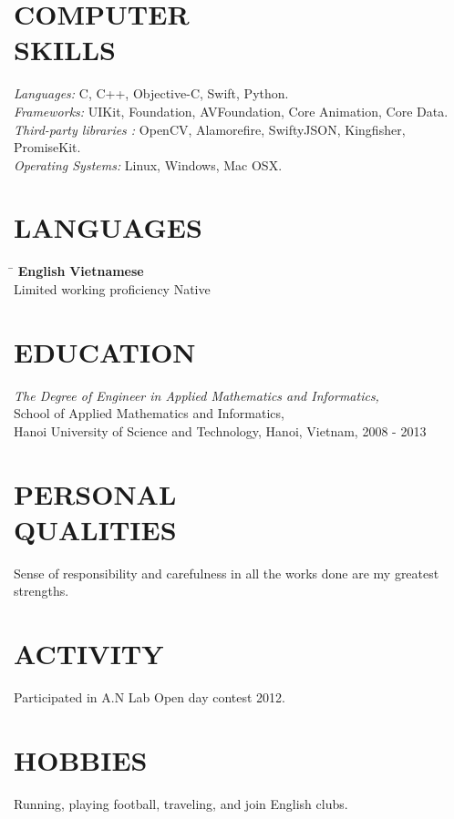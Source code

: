 \documentclass[margin, 10pt]{res}
\begin{document}
\begin{resume}
\section{COMPUTER \\ SKILLS}
   {\sl Languages:} C, C++, Objective-C, Swift, Python.\\
   {\sl Frameworks:} UIKit, Foundation, AVFoundation, Core Animation, Core Data.\\
   {\sl Third-party libraries :} OpenCV, Alamorefire, SwiftyJSON, Kingfisher, PromiseKit.\\
   {\sl Operating Systems:} Linux, Windows, Mac OSX.

\section{LANGUAGES}
	\vspace{-0.1in}
	\begin{tabbing}
    \hspace{2.8in}\= \kill %
    \textbf{English}            \> \textbf{Vietnamese}\\
    Limited working proficiency \> Native\\
	\end{tabbing}\vspace{-20pt}
	
\section{EDUCATION}
   {\sl The Degree of Engineer in Applied Mathematics and Informatics,}\\
   School of Applied Mathematics and Informatics, \\
   Hanoi University of Science and Technology, Hanoi, Vietnam, 2008 - 2013 \\
	
\section{PERSONAL \\ QUALITIES} Sense of responsibility and carefulness in all the works done are my greatest strengths.\\
 
\section{ACTIVITY} Participated in A.N Lab Open day contest 2012.

\section{HOBBIES} Running, playing football, traveling, and join English clubs.

\end{resume}
\end{document}
